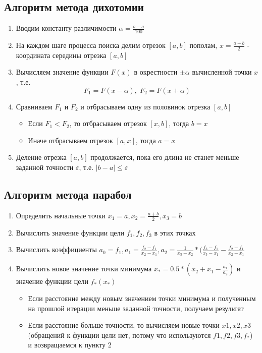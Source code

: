 \documentclass[../body.tex]{subfiles}
\begin{document}
\subsection{Алгоритм метода дихотомии}
\begin{enumerate}
    \item Вводим константу различимости $\alpha=\frac{b-a}{100}$
    \item На каждом шаге процесса поиска делим отрезок $[a,b]$ пополам, $x=\frac{a+b}{2}$ - координата середины отрезка $[a,b]$
    \item Вычисляем значение функции $F(x)$ в окрестности $\pm \alpha$ вычисленной точки $x$, т.е.
        \begin{equation}
            F_1=F(x-\alpha),\; F_2=F(x+\alpha)
        \end{equation}
    \item Сравниваем $F_1$ и $F_2$ и отбрасываем одну из половинок отрезка $[a,b]$
         \begin{itemize}
            \item Если $F_1<F_2$, то отбрасываем отрезок $[x,b]$, тогда $b=x$
            \item Иначе отбрасываем отрезок $[a,x]$, тогда $a=x$
        \end{itemize}
    \item Деление отрезка $[a,b]$ продолжается, пока его длина не станет меньше заданной точности $\varepsilon$, т.е. $|b-a| \le \varepsilon$
\end{enumerate}

\subsection{Алгоритм метода парабол}
\begin{enumerate}
    \item Определить начальные точки $x_1=a,x_2=\frac{a+b}{2},x_3=b$
    \item Вычислить значение функции цели $f_1, f_2, f_3$ в этих точках
    \item Вычислить коэффициенты $a_0=f_1,a_1=\frac{f_2-f_1}{x_2-x_1},a_2=\frac{1}{x_3-x_2}*(\frac{f_3-f_1}{x_3-x_1}-\frac{f_2-f_1}{x_2-x_1}$
    \item Вычислить новое значение точки минимума $x_*=0.5*(x_2+x_1-\frac{a_1}{a_2})$ и значение функции цели $f_*(x_*)$
        \begin{itemize}
            \item Если расстояние между новым значением точки минимума и полученным на прошлой итерации меньше заданной точности, получаем результат
            \item Если расстояние больше точности, то вычисляем новые точки $x1, x2, x3$ (обращений к функции цели нет, потому что используются $f1, f2, f3, f_*$) и возвращаемся к пункту 2
        \end{itemize}
\end{enumerate}
\end{document}
